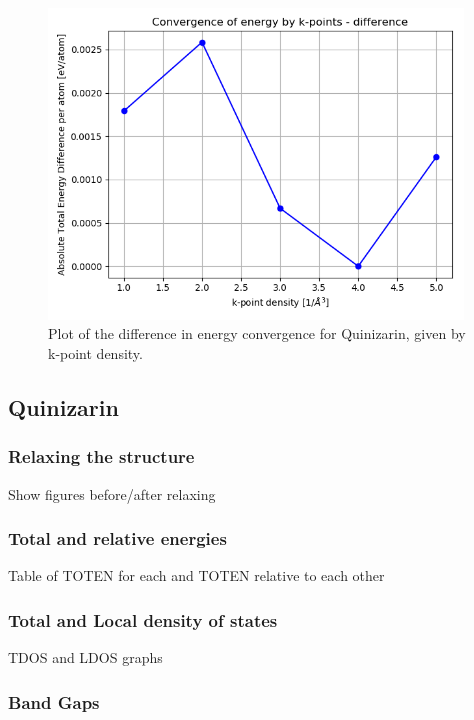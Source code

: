 \documentclass{article}
\begin{document}
    \begin{figure}[H]
        \centering
        \includegraphics[width = 11cm]{../fig/convergence_kpoints_difference.png}
        \caption{Plot of the difference in energy convergence for Quinizarin, given by k-point density. }
        \label{fig:convergence_kpoints_difference.png}
    \end{figure}
    \fi

  \subsection{Quinizarin}

    \subsubsection{Relaxing the structure}

      Show figures before/after relaxing

    \subsubsection{Total and relative energies}

      Table of TOTEN for each and TOTEN relative to each other

    \subsubsection{Total and Local density of states}

      TDOS and LDOS graphs

    \subsubsection{Band Gaps}
\end{document}
